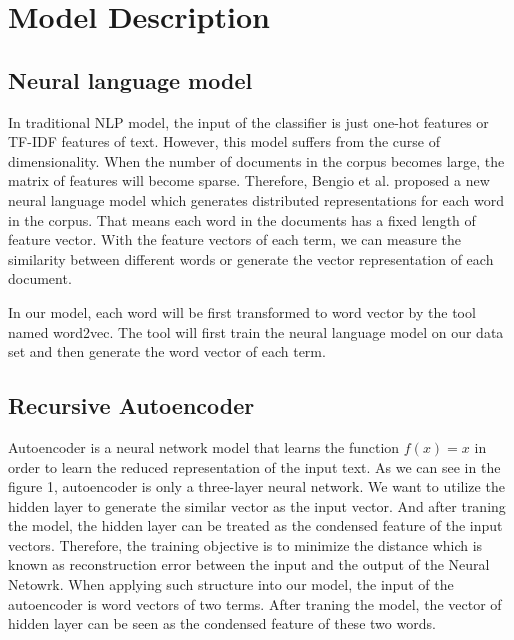 \documentclass[dvips,9pt]{article}
\begin{document}
	\section{Model Description}
\subsection{Neural language model}
In traditional NLP model, the input of the classifier is just one-hot features or TF-IDF features of text. However, this model suffers from the curse of dimensionality. When the number of documents in the corpus becomes large, the matrix of features will become sparse. Therefore, Bengio et al.\cite{Bengio2003NLP} proposed a new neural language model which generates distributed representations for each word in the corpus. That means each word in the documents has a fixed length of feature vector. With the feature vectors of each term, we can measure the similarity between different words or generate the vector representation of each document.

In our model, each word will be first transformed to word vector by the tool named word2vec\cite{mikolov2013efficient}. The tool will first train the neural language model on our data set and then generate the word vector of each term.

\subsection{Recursive Autoencoder}
Autoencoder is a neural network model that learns the function $f(x)=x$ in order to learn the reduced representation of the input text. As we can see in the figure 1, autoencoder is only a three-layer neural network. We want to utilize the hidden layer to generate the similar vector as the input vector. And after traning the model, the hidden layer can be treated as the condensed feature of the input vectors. Therefore, the training objective is to minimize the distance which is known as reconstruction error between the input and the output of the Neural Netowrk. When applying such structure into our model, the input of the autoencoder is word vectors of two terms. After traning the model, the vector of hidden layer can be seen as the condensed feature of these two words.
\end{document}
